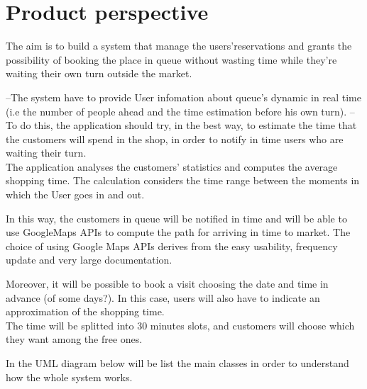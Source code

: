 \section{Product perspective}
The aim is to build a system that manage the users’reservations and grants the possibility of booking the place in queue without wasting time while they're waiting their own turn outside the market. 
\par
--The system have to provide User infomation about queue's dynamic in real time (i.e the number of people ahead and the time estimation before his own turn). --
To do this, the application should try, in the best way, to estimate the time that the customers will spend in the shop, in order to notify in time users who are waiting their turn. 
\\
The application analyses the customers’ statistics and computes the average shopping time.
The calculation considers the time range between the moments in which the User goes in and out.  
\par
In this way, the customers in queue will be notified in time and will be able to use GoogleMaps APIs to compute the path for arriving in time to market. 
The choice of using Google Maps APIs derives from the easy usability, frequency update and very large documentation.
\par
Moreover, it will be possible to book a visit choosing the date and time in advance (of some days?). In this case, users will also have to indicate an approximation of the shopping time. 
\\
The time will be splitted into 30 minutes slots, and customers will choose which they want among the free ones. \par
\bigskip
In the UML diagram below will be list the main classes in order to understand how the whole system works.
\par 
\bigskip
\bigskip


